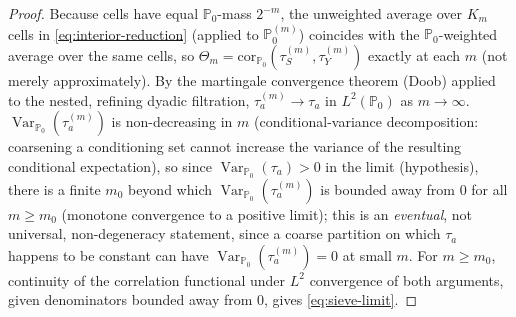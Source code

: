 \documentclass[11pt]{article}
\theoremstyle{plain}
\theoremstyle{definition}
\theoremstyle{remark}
\newcommand{\PP}{\mathbb{P}}
\newcommand{\Corr}{\mathrm{cor}}
\DeclareMathOperator{\Var}{Var}
\begin{document}
\begin{proof}
Because cells have equal $\PP_0$-mass $2^{-m}$, the unweighted average over $K_m$
cells in \eqref{eq:interior-reduction} (applied to $\PP_0^{(m)}$) coincides with the
$\PP_0$-weighted average over the same cells, so
$\Theta_m=\Corr_{\PP_0}(\tau_S^{(m)},\tau_Y^{(m)})$ exactly at each $m$ (not merely
approximately). By the martingale convergence theorem (Doob) applied to the nested,
refining dyadic filtration, $\tau_a^{(m)}\to\tau_a$ in $L^2(\PP_0)$ as $m\to\infty$.
$\Var_{\PP_0}(\tau_a^{(m)})$ is non-decreasing in $m$ (conditional-variance
decomposition: coarsening a conditioning set cannot increase the variance of the
resulting conditional expectation), so since $\Var_{\PP_0}(\tau_a)>0$ in the limit
(hypothesis), there
is a finite $m_0$ beyond which $\Var_{\PP_0}(\tau_a^{(m)})$ is bounded away from $0$
for all $m\ge m_0$ (monotone convergence to a positive limit); this is an
\emph{eventual}, not universal, non-degeneracy statement, since a coarse partition
on which $\tau_a$ happens to be constant can have $\Var_{\PP_0}(\tau_a^{(m)})=0$ at
small $m$. For $m\ge m_0$, continuity of the correlation functional under $L^2$
convergence of both arguments, given denominators bounded away from $0$, gives
\eqref{eq:sieve-limit}.
\end{proof}
\end{document}
